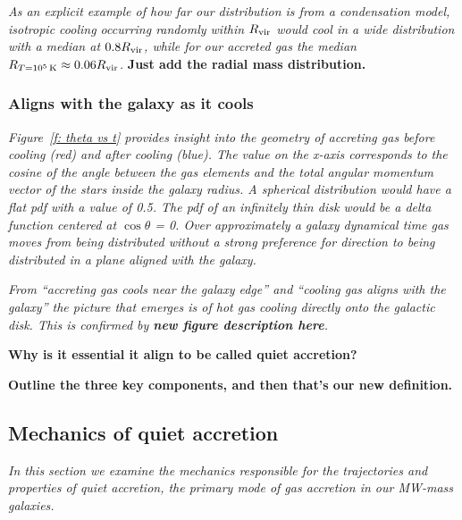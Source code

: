 \documentclass[fleqn,usenatbib]{mnras}
\newcommand{\Rcon}{R_{T=10^5\,{\rm K}}}
\begin{document}
\textit{
As an explicit example of how far our distribution is from a condensation model, isotropic cooling occurring randomly within $R_{\rm vir}$ would cool in a wide distribution with a median at $0.8 R_{\rm vir}$, while for our accreted gas the median $\Rcon \approx 0.06 R_{\rm vir}$.
}
\textbf{Just add the radial mass distribution.}

\subsubsection{Aligns with the galaxy as it cools}
\label{s: aligns}

\textit{
Figure~\ref{f: theta vs t} provides insight into the geometry of accreting gas before cooling (red) and after cooling (blue).
The value on the x-axis corresponds to the cosine of the angle between the gas elements and the total angular momentum vector of the stars inside the galaxy radius.
A spherical distribution would have a flat pdf with a value of 0.5.
The pdf of an infinitely thin disk would be a delta function centered at $\cos\theta$ = 0.
Over approximately a galaxy dynamical time gas moves from being distributed without a strong preference for direction to being distributed in a plane aligned with the galaxy.
}

\textit{
From ``accreting gas cools near the galaxy edge'' and ``cooling gas aligns with the galaxy'' the picture that emerges is of hot gas cooling directly onto the galactic disk.
This is confirmed by \textbf{new figure description here}.
}

\textbf{Why is it essential it align to be called quiet accretion?}


\textbf{Outline the three key components, and then that's our new definition.}

\subsection{Mechanics of quiet accretion}
\label{s: mechanics}

\textit{
In this section we examine the mechanics responsible for the trajectories and properties of quiet accretion, the primary mode of gas accretion in our MW-mass galaxies.
}
\end{document}
